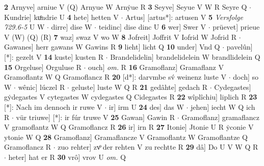 \documentclass[8pt,a4paper,notitlepage]{article}
\begin{document}
\begin{table}[ht]
\begin{minipage}[t]{0.5\linewidth}
\textbf{2} Arnyve] arniue V (Q) Arnyue W Arnẏue R \textbf{3} Seyve] Seyue V W R Seyre Q  $\cdot$ Kundrie] kuͦndrie U \textbf{4} hete] hetten V  $\cdot$ Artus] [artus*]: artusen V \textbf{5} \textit{Versfolge 729.6-5} U W   $\cdot$ dirre] dise W  $\cdot$ teidinc] dise dinc U \textbf{6} wer] Swer V  $\cdot$ prüevet] prieue V (W) (Q) (R) \textbf{7} waz] swaz V wo W \textbf{8} Jofreit] Joffrit V Iofrid W Jofrid R  $\cdot$ Gawanes] herr gawans W Gawins R \textbf{9} lieht] licht Q \textbf{10} under] Vnd Q  $\cdot$ pavelûn] [*]: gezelt V \textbf{14} kuste] kusten R  $\cdot$ Brandelidelin] brandelidelein W brandlidelein Q \textbf{15} Orgeluse] Orguluse R  $\cdot$ ouch] \textit{om.} R \textbf{16} Gramoflanz] Gramaflanz V Gramoflantz W Q Gramoflancz R \textbf{20} [d*]: darvmbe sv́ weinenz luste V  $\cdot$ doch] so W  $\cdot$ wênic] lúczel R  $\cdot$ geluste] luste W Q R \textbf{21} gedâhte] gedach R  $\cdot$ Cydegastes] gẏdegastes V cytegastes W cydegastes Q Cidegastes R \textbf{22} wîplîchiu] liplich R \textbf{23} [*]: Nach im dennoch ir ruwe V  $\cdot$ ir] irm U \textbf{24} des] das W  $\cdot$ jehen] iecht W Q ich R  $\cdot$ vür triuwe] [*]: ir fúr truwe V \textbf{25} Gawan] Gawin R  $\cdot$ Gramoflanz] gramaflancz V gramoflantz W Q Gramoflancz R \textbf{26} ir] irn R \textbf{27} Itonie] Jtonie U R ẏconie V ytonie W Q \textbf{28} Gramoflanz] Gramaflancze V Gramoflantz W Gramoflantze Q Gramoflancz R  $\cdot$ zuo rehter] zvͦ der rehten V zu rechtte R \textbf{29} dâ] Do U V W Q R  $\cdot$ heter] hat er R \textbf{30} vrô] vrov U \textit{om.} Q \newline
\end{minipage}
\end{table}
\end{document}
